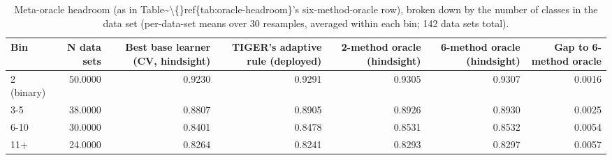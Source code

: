 \begin{table}[t]
\centering
\begin{tabular}{lrrrrrr}
\toprule
Bin & N data sets & Best base learner (CV, hindsight) & TIGER's adaptive rule (deployed) & 2-method oracle (hindsight) & 6-method oracle (hindsight) & Gap to 6-method oracle \\
\midrule
2 (binary) & 50.0000 & 0.9230 & 0.9291 & 0.9305 & 0.9307 & 0.0016 \\
3-5 & 38.0000 & 0.8807 & 0.8905 & 0.8926 & 0.8930 & 0.0025 \\
6-10 & 30.0000 & 0.8401 & 0.8478 & 0.8531 & 0.8532 & 0.0054 \\
11+ & 24.0000 & 0.8264 & 0.8241 & 0.8293 & 0.8297 & 0.0057 \\
\bottomrule
\end{tabular}
\caption{Meta-oracle headroom (as in Table\textasciitilde{}\textbackslash\{\}ref\{tab:oracle-headroom\}'s six-method-oracle row), broken down by the number of classes in the data set (per-data-set means over 30 resamples, averaged within each bin; 142 data sets total).}
\label{tab:oracle-headroom-by-nclasses}
\end{table}